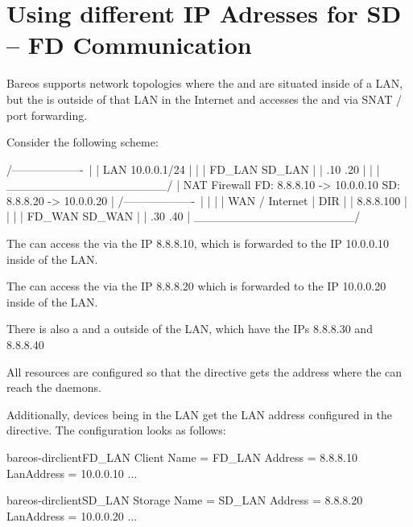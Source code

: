    \section{Using different IP Adresses for SD -- FD Communication}
   \label{LanAddress}

Bareos supports network
topologies where the \bareosFd and \bareosSd are situated inside of a LAN,  but the \bareosDir is
outside of that LAN in the Internet and accesses the \bareosFd and \bareosSd via SNAT / port forwarding.

Consider the following scheme:

\begin{commands}{}
   /-------------------\
   |                   |    LAN 10.0.0.1/24
   |                   |
   |  FD_LAN   SD_LAN  |
   |  .10         .20  |
   |                   |
   \___________________/
             |
         NAT Firewall
         FD: 8.8.8.10 -> 10.0.0.10
         SD: 8.8.8.20 -> 10.0.0.20
             |
   /-------------------\
   |                   |
   |                   |     WAN / Internet
   |        DIR        |
   |     8.8.8.100     |
   |                   |
   | FD_WAN   SD_WAN   |
   | .30         .40   |
   \___________________/
\end{commands}

The \bareosDir can access the  via the IP 8.8.8.10, which is
forwarded to the IP 10.0.0.10 inside of the LAN.

The \bareosDir can access the  via the IP 8.8.8.20 which is
forwarded to the IP 10.0.0.20 inside of the LAN.

There is also a \bareosFd and a \bareosSd outside of the LAN, which have the IPs
8.8.8.30 and 8.8.8.40

All resources are configured so that the  directive gets the
address where the \bareosDir can reach the daemons.

Additionally, devices being in the LAN get the LAN address configured in
the  directive. The configuration looks as follows:

\begin{bareosConfigResource}{bareos-dir}{client}{FD\_LAN}
Client {
   Name = FD_LAN
   Address = 8.8.8.10
   LanAddress = 10.0.0.10
   ...
}
\end{bareosConfigResource}

\begin{bareosConfigResource}{bareos-dir}{client}{SD\_LAN}
Storage {
   Name = SD_LAN
   Address = 8.8.8.20
   LanAddress = 10.0.0.20
   ...
}
\end{bareosConfigResource}

